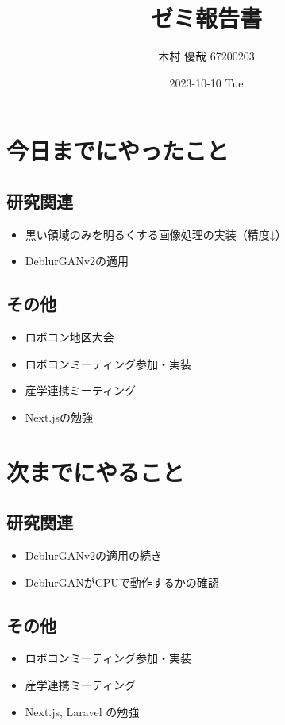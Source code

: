 \documentclass[uplatex, onecolumn, 10pt]{jsarticle}
\begin{document}
\title{\vspace{-40mm}\bf{\LARGE{ゼミ報告書}}}
\author{\vspace{-40mm}木村 優哉 67200203}
\date{2023-10-10 Tue}
\maketitle


\section{今日までにやったこと}

\subsection*{研究関連}
\begin{itemize}
	\item 黒い領域のみを明るくする画像処理の実装（精度↓）
	\item DeblurGANv2の適用
\end{itemize}

\subsection*{その他}
\begin{itemize}
	\item ロボコン地区大会
	\item ロボコンミーティング参加・実装
	\item 産学連携ミーティング
	\item Next.jsの勉強
\end{itemize}


\section{次までにやること}

\subsection*{研究関連}
\begin{itemize}
	\item DeblurGANv2の適用の続き
	\item DeblurGANがCPUで動作するかの確認
\end{itemize}

\subsection*{その他}
\begin{itemize}
	\item ロボコンミーティング参加・実装
	\item 産学連携ミーティング
	\item Next.js, Laravel の勉強
\end{itemize}
\end{document}
